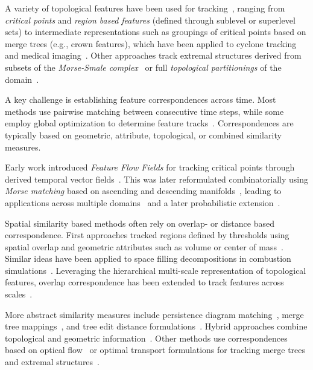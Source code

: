 \documentclass[review]{vgtc}                          %
\begin{document}
A variety of topological features have been used for tracking~\cite{Yan2021b}, ranging from \emph{critical points} and \emph{region based features} (defined through sublevel or superlevel sets) to intermediate representations such as groupings of critical points based on merge trees (e.g., crown features), which have been applied to cyclone tracking and medical imaging~\cite{Engelke2020,Nilsson2022Cyclone,Rasheed2022}. Other approaches track extremal structures derived from subsets of the \emph{Morse-Smale complex}~\cite{Li2023,Das2024} or full \emph{topological partitionings} of the domain~\cite{Schnorr2020}.

A key challenge is establishing feature correspondences across time. Most methods use pairwise matching between consecutive time steps, while some employ global optimization to determine feature tracks~\cite{Schnorr2020,Saikia2017}. Correspondences are typically based on geometric, attribute, topological, or combined similarity measures.

Early work introduced \emph{Feature Flow Fields} for tracking critical points through derived temporal vector fields~\cite{Weinkauf2011}. This was later reformulated combinatorially using \emph{Morse matching} based on ascending and descending manifolds~\cite{Reininghaus2011}, leading to applications across multiple domains~\cite{Engelke2020,Nilsson2022Cyclone} and a later probabilistic extension~\cite{Nilsson2023}.

Spatial similarity based methods often rely on overlap- or distance based correspondence. First approaches tracked regions defined by thresholds using spatial overlap and geometric attributes such as volume or center of mass~\cite{Samtaney1994,silver1998tracking}. Similar ideas have been applied to space filling decompositions in combustion simulations~\cite{Weber2011,Schnorr2020}. Leveraging the hierarchical multi-scale representation of topological features, overlap correspondence has been extended to track features across scales~\cite{Widanagamaachchi2012,Saikia2017,lukasczyk2017nested}.

More abstract similarity measures include persistence diagram matching~\cite{Cohen-Steiner2010,Soler2018}, merge tree mappings~\cite{Sridharamurthy2020}, and tree edit distance formulations~\cite{Wetzels2022a,Wetzels2023,Wetzels2024ElectronDensity}. Hybrid approaches combine topological and geometric information~\cite{Yan2022b}. Other methods use correspondences based on optical flow~\cite{Valsangkar2019} or optimal transport formulations for tracking merge trees and extremal structures~\cite{Li2023,Li2025,Das2024}.
\end{document}

